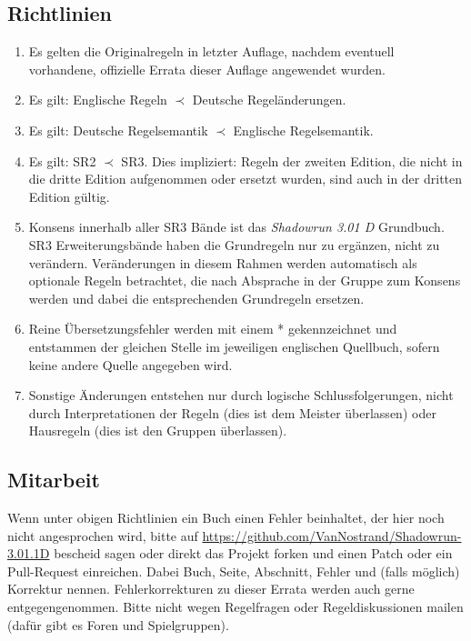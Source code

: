 \documentclass[a4paper]{scrartcl}
\newcommand{\projekturl}{\url{https://github.com/VanNostrand/Shadowrun-3.01.1D}}
\begin{document}
\subsection{Richtlinien}
\begin{framed}
\begin{enumerate}
 \item Es gelten die Originalregeln in letzter Auflage, nachdem eventuell vorhandene, offizielle Errata dieser Auflage angewendet wurden.
 \item Es gilt: Englische Regeln $\prec$ Deutsche Regeländerungen.
 \item Es gilt: Deutsche Regelsemantik $\prec$ Englische Regelsemantik.
 \item Es gilt: SR2 $\prec$ SR3. Dies impliziert: Regeln der zweiten Edition, die nicht in die dritte Edition aufgenommen oder ersetzt wurden, sind auch in der dritten Edition gültig.
 \item Konsens innerhalb aller SR3 Bände ist das \textit{Shadowrun 3.01 D} Grundbuch. SR3 Erweiterungsbände haben die Grundregeln nur zu ergänzen, nicht zu verändern. Veränderungen in diesem Rahmen werden automatisch als optionale Regeln betrachtet, die nach Absprache in der Gruppe zum Konsens werden und dabei die entsprechenden Grundregeln ersetzen.
 \item Reine Übersetzungsfehler werden mit einem * gekennzeichnet und entstammen der gleichen Stelle im jeweiligen englischen Quellbuch, sofern keine andere Quelle angegeben wird.
 \item Sonstige Änderungen entstehen nur durch logische Schlussfolgerungen, nicht durch Interpretationen der Regeln (dies ist dem Meister überlassen) oder Hausregeln (dies ist den Gruppen überlassen).
\end{enumerate}
\end{framed}

\subsection{Mitarbeit}
Wenn unter obigen Richtlinien ein Buch einen Fehler beinhaltet, der hier noch nicht angesprochen wird, bitte auf \projekturl{} bescheid sagen oder direkt das Projekt forken und einen Patch oder ein Pull-Request einreichen.
Dabei Buch, Seite, Abschnitt, Fehler und (falls möglich) Korrektur nennen.
Fehlerkorrekturen zu dieser Errata werden auch gerne entgegengenommen.
Bitte nicht wegen Regelfragen oder Regeldiskussionen mailen (dafür gibt es Foren und Spielgruppen).
\end{document}
